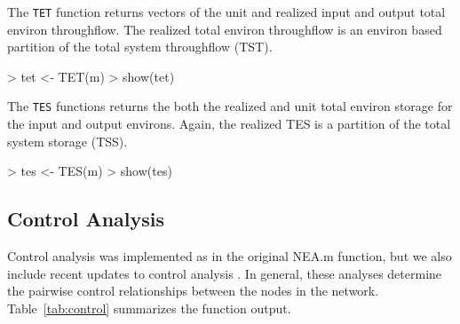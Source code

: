 \documentclass[article]{jss}
\begin{document}
\begin{Schunk}
\end{Schunk}

The \texttt{TET} function returns vectors of the unit and realized
input and output total environ throughflow.  The realized total
environ throughflow is an environ based partition of the total system
throughflow (TST).

\begin{Schunk}
\begin{Sinput}
> tet <- TET(m)
> show(tet)
\end{Sinput}
\end{Schunk}

The \texttt{TES} functions returns the both the realized and unit
total environ storage for the input and output environs.  Again, the
realized TES is a partition of the total system storage (TSS).

\begin{Schunk}
\begin{Sinput}
> tes <- TES(m)
> show(tes)
\end{Sinput}
\end{Schunk}

\subsection{Control Analysis}



Control analysis was implemented as in the original NEA.m function,
but we also include recent updates to control analysis
\citep[e.g.,][]{schramski06, schramski07}.  In general, these analyses
determine the pairwise control relationships between the nodes in the
network.  Table~\ref{tab:control} summarizes the function output.
\end{document}

